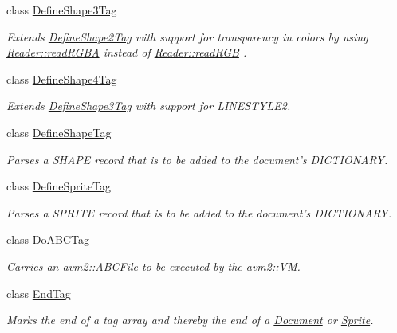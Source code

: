 \begin{DoxyCompactItemize}
class \hyperlink{classjswf_1_1flash_1_1tags_1_1_define_shape3_tag}{Define\+Shape3\+Tag}
\begin{DoxyCompactList}\small\item\em Extends \hyperlink{classjswf_1_1flash_1_1tags_1_1_define_shape2_tag}{Define\+Shape2\+Tag} with support for transparency in colors by using \hyperlink{classjswf_1_1flash_1_1_reader_a2c89e5f540d698d4d4fc4dc983dcf81c}{Reader\+::read\+R\+G\+B\+A} instead of \hyperlink{classjswf_1_1flash_1_1_reader_abba53a3337f589e3641681c2251e4d8d}{Reader\+::read\+R\+G\+B} . \end{DoxyCompactList}\item 
class \hyperlink{classjswf_1_1flash_1_1tags_1_1_define_shape4_tag}{Define\+Shape4\+Tag}
\begin{DoxyCompactList}\small\item\em Extends \hyperlink{classjswf_1_1flash_1_1tags_1_1_define_shape3_tag}{Define\+Shape3\+Tag} with support for {\ttfamily L\+I\+N\+E\+S\+T\+Y\+L\+E2}. \end{DoxyCompactList}\item 
class \hyperlink{classjswf_1_1flash_1_1tags_1_1_define_shape_tag}{Define\+Shape\+Tag}
\begin{DoxyCompactList}\small\item\em Parses a {\ttfamily S\+H\+A\+P\+E} record that is to be added to the document's {\ttfamily D\+I\+C\+T\+I\+O\+N\+A\+R\+Y}. \end{DoxyCompactList}\item 
class \hyperlink{classjswf_1_1flash_1_1tags_1_1_define_sprite_tag}{Define\+Sprite\+Tag}
\begin{DoxyCompactList}\small\item\em Parses a {\ttfamily S\+P\+R\+I\+T\+E} record that is to be added to the document's {\ttfamily D\+I\+C\+T\+I\+O\+N\+A\+R\+Y}. \end{DoxyCompactList}\item 
class \hyperlink{classjswf_1_1flash_1_1tags_1_1_do_a_b_c_tag}{Do\+A\+B\+C\+Tag}
\begin{DoxyCompactList}\small\item\em Carries an {\ttfamily \hyperlink{classjswf_1_1avm2_1_1_a_b_c_file}{avm2\+::\+A\+B\+C\+File}} to be executed by the \hyperlink{classjswf_1_1avm2_1_1_v_m}{avm2\+::\+V\+M}. \end{DoxyCompactList}\item 
class \hyperlink{classjswf_1_1flash_1_1tags_1_1_end_tag}{End\+Tag}
\begin{DoxyCompactList}\small\item\em Marks the end of a tag array and thereby the end of a \hyperlink{classjswf_1_1flash_1_1_document}{Document} or \hyperlink{classjswf_1_1flash_1_1_sprite}{Sprite}. \end{DoxyCompactList}\item 

\end{DoxyCompactItemize}
